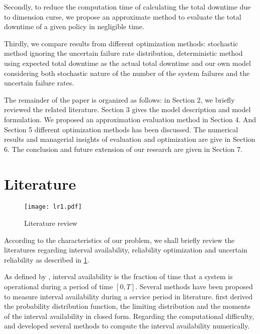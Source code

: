 \documentclass[preprint,12pt]{elsarticle}
\begin{document}
Secondly, to reduce the computation time of calculating the total downtime due to dimension curse, we propose an approximate method to evaluate the total downtime of a given policy in negligible time.

Thirdly, we compare results from different optimization methods: stochastic method ignoring the uncertain failure rate distribution, deterministic method using expected total downtime as the actual total downtime and our own model considering both stochastic nature of the number of the system failures and the uncertain failure rates.

The remainder of the paper is organized as follows: in Section 2, we briefly reviewed the related literature. Section 3 gives the model description and model formulation. We proposed an approximation evaluation method in Section 4. And Section 5 different optimization methods has been discussed. The numerical results and managerial insights of evaluation and optimization are give in Section 6. The conclusion and future extension of our research are given in Section 7.

\section{Literature}

\begin{figure}
\centering
\texttt{[image: lr1.pdf]}
 \caption{Literature review}
 \label{fig:literature}
\end{figure}
According to the characteristics of our problem, we shall briefly review the literatures regarding interval availability, reliability optimization and uncertain reliability as described in \ref{fig:literature}.

As defined by \citet{Nakagawa}, interval availability is the fraction of time that a system is operational during a period of time $[0,T]$. Several methods have been proposed to measure interval availability during a service period in literature. \citet{Takacs} first derived the probability distribution function, the limiting distribution and the moments of the interval availability in closed form. Regarding the computational difficulty, \citet{DeSouza} and \citet{AlHanbali} developed several methods to compute the interval availability numerically.
%
\end{document}
